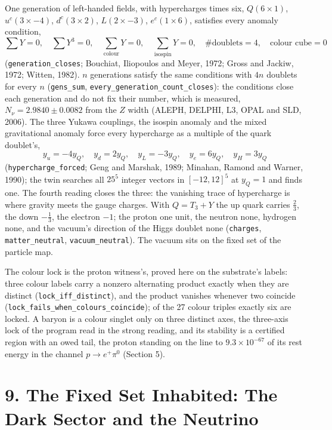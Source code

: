 \documentclass[10pt]{article}
\begin{document}
One generation of left-handed fields, with hypercharges times six,
\(Q(6\times1)\), \(u^c(3\times-4)\), \(d^c(3\times2)\),
\(L(2\times-3)\), \(e^c(1\times6)\), satisfies every anomaly condition,
\[\sum Y=0,\quad \sum Y^{3}=0,\quad \sum_{\text{colour}} Y=0,\quad \sum_{\text{isospin}} Y=0,\quad \#\text{doublets}=4,\quad \text{colour cube}=0\]
(\texttt{generation\_closes}; Bouchiat, Iliopoulos and Meyer, 1972;
Gross and Jackiw, 1972; Witten, 1982). \(n\) generations satisfy the
same conditions with \(4n\) doublets for every \(n\)
(\texttt{gens\_sum}, \texttt{every\_generation\_count\_closes}): the
conditions close each generation and do not fix their number, which is
measured, \(N_\nu=2.9840\pm0.0082\) from the \(Z\) width (ALEPH, DELPHI,
L3, OPAL and SLD, 2006). The three Yukawa couplings, the isospin anomaly
and the mixed gravitational anomaly force every hypercharge as a
multiple of the quark doublet's,
\[y_u=-4y_Q,\quad y_d=2y_Q,\quad y_L=-3y_Q,\quad y_e=6y_Q,\quad y_H=3y_Q\]
(\texttt{hypercharge\_forced}; Geng and Marshak, 1989; Minahan, Ramond
and Warner, 1990); the twin searches all \(25^5\) integer vectors in
\([-12,12]^5\) at \(y_Q=1\) and finds one. The fourth reading closes the
three: the vanishing trace of hypercharge is where gravity meets the
gauge charges. With \(Q=T_3+Y\) the up quark carries \(\tfrac23\), the
down \(-\tfrac13\), the electron \(-1\); the proton one unit, the
neutron none, hydrogen none, and the vacuum's direction of the Higgs
doublet none (\texttt{charges}, \texttt{matter\_neutral},
\texttt{vacuum\_neutral}). The vacuum sits on the fixed set of the
particle map.

The colour lock is the proton witness's, proved here on the substrate's
labels: three colour labels carry a nonzero alternating product exactly
when they are distinct (\texttt{lock\_iff\_distinct}), and the product
vanishes whenever two coincide
(\texttt{lock\_fails\_when\_colours\_coincide}); of the 27 colour
triples exactly six are locked. A baryon is a colour singlet only on
three distinct axes, the three-axis lock of the program read in the
strong reading, and its stability is a certified region with an owed
tail, the proton standing on the line to \(9.3\times10^{-67}\) of its
rest energy in the channel \(p\to e^+\pi^0\) (Section 5).

\hypertarget{the-fixed-set-inhabited-the-dark-sector-and-the-neutrino}{%
\section{9. The Fixed Set Inhabited: The Dark Sector and the
Neutrino}\label{the-fixed-set-inhabited-the-dark-sector-and-the-neutrino}}
\end{document}
